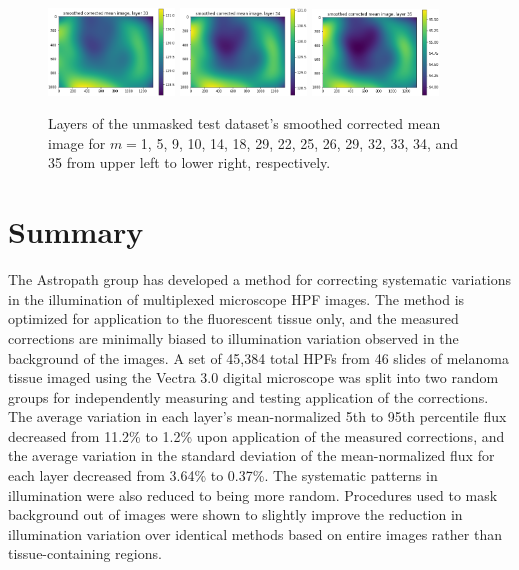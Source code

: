 \documentclass[letterpaper,11pt]{article}
\begin{document}
\begin{figure}[!ht]
\includegraphics[width=0.3\textwidth]{images/results/unmasked_smoothed_corrected_mean_image_layers/unmasked_smoothed_corrected_mean_image_layer_33}
\includegraphics[width=0.3\textwidth]{images/results/unmasked_smoothed_corrected_mean_image_layers/unmasked_smoothed_corrected_mean_image_layer_34}
\includegraphics[width=0.3\textwidth]{images/results/unmasked_smoothed_corrected_mean_image_layers/unmasked_smoothed_corrected_mean_image_layer_35}
\caption{\footnotesize Layers of the unmasked test dataset's smoothed corrected mean image for $m=$1, 5, 9, 10, 14, 18, 29, 22, 25, 26, 29, 32, 33, 34, and 35 from upper left to lower right, respectively.}
\label{fig:unmasked_smoothed_corrected_mean_image_layers}
\end{figure}

\section{Summary}
\label{sec:summary}

The Astropath group has developed a method for correcting systematic variations in the illumination of multiplexed microscope HPF images. The method is optimized for application to the fluorescent tissue only, and the measured corrections are minimally biased to illumination variation observed in the background of the images. A set of 45,384 total HPFs from 46 slides of melanoma tissue imaged using the Vectra 3.0 digital microscope was split into two random groups for independently measuring and testing application of the corrections. The average variation in each layer's mean-normalized 5th to 95th percentile flux decreased from 11.2\% to 1.2\% upon application of the measured corrections, and the average variation in the standard deviation of the mean-normalized flux for each layer decreased from 3.64\% to 0.37\%. The systematic patterns in illumination were also reduced to being more random. Procedures used to mask background out of images were shown to slightly improve the reduction in illumination variation over identical methods based on entire images rather than tissue-containing regions.

\clearpage

\end{document}
